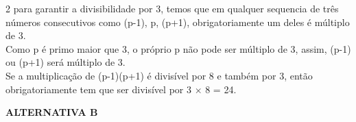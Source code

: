 \begin{solucoes}{2}
    para garantir a divisibilidade por 3, temos que em qualquer sequencia  de três números consecutivos como (p-1), p, (p+1), obrigatoriamente um deles é múltiplo de 3. \\

    Como p é primo maior que 3, o próprio p não pode ser múltiplo de 3, assim, (p-1) ou (p+1) será múltiplo de 3.\\

    Se a multiplicação de (p-1)(p+1) é divisível por 8 e também por 3, então obrigatoriamente tem que ser divisível  por 3 $\times$ 8 = 24.

    \textbf{ALTERNATIVA B}
\end{solucoes}
